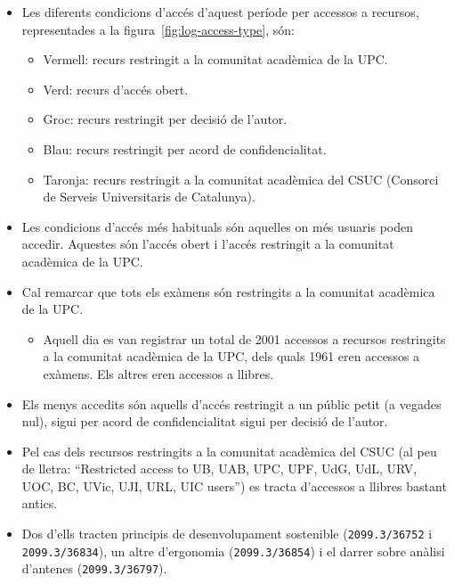\begin{itemize}
    \item Les diferents condicions d'accés d'aquest període per accessos a recursos, representades a la figura~\ref{fig:log-access-type}, són:
    \begin{itemize}
        \item Vermell: recurs restringit a la comunitat acadèmica de la UPC.
        \item Verd: recurs d'accés obert.
        \item Groc: recurs restringit per decisió de l'autor.
        \item Blau: recurs restringit per acord de confidencialitat.
        \item Taronja: recurs restringit a la comunitat acadèmica del CSUC (Consorci de Serveis Universitaris de Catalunya).
    \end{itemize}

    \item Les condicions d'accés més habituals són aquelles on més usuaris poden accedir.
    Aquestes són l'accés obert i l'accés restringit a la comunitat acadèmica de la UPC.
    \item Cal remarcar que tots els exàmens són restringits a la comunitat acadèmica de la UPC.
    \begin{itemize}
        \item Aquell dia es van registrar un total de 2001 accessos a recursos restringits a la comunitat acadèmica de la UPC, dels quals 1961 eren accessos a exàmens.
        Els altres eren accessos a llibres.
    \end{itemize}
    \item Els menys accedits són aquells d'accés restringit a un públic petit (a vegades nul), sigui per acord de confidencialitat sigui per decisió de l'autor.
    \clearpage
    \item Pel cas dels recursos restringits a la comunitat acadèmica del CSUC (al peu de lletra: “Restricted access to UB, UAB, UPC, UPF, UdG, UdL, URV, UOC, BC, UVic, UJI, URL, UIC users”) es tracta d'accessos a llibres bastant antics.
    \item Dos d'ells tracten principis de desenvolupament sostenible (\texttt{2099.3/36752} i \texttt{2099.3/36834}), un altre d'ergonomia (\texttt{2099.3/36854}) i el darrer sobre anàlisi d'antenes (\texttt{2099.3/36797}).

\end{itemize}